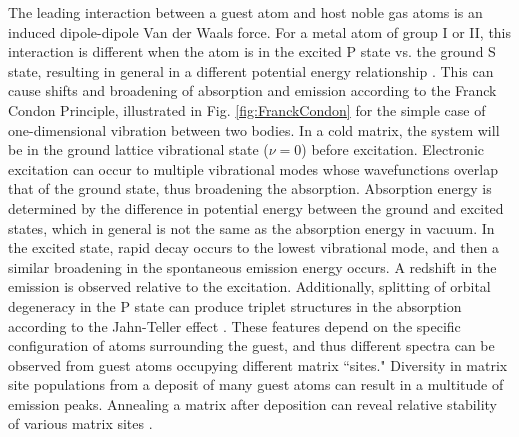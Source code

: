 
The leading interaction between a guest atom and host noble gas atoms is an induced dipole-dipole Van der Waals force.  For a metal atom of group I or II, this interaction is different when the atom is in the excited P state vs. the ground S state, resulting in general in a different potential energy relationship \cite{crepin}.  This can cause shifts and broadening of absorption and emission according to the Franck Condon Principle, illustrated in Fig. \ref{fig:FranckCondon} for the simple case of one-dimensional vibration between two bodies.  In a cold matrix, the system will be in the ground lattice vibrational state ($\nu =0$) before excitation.  Electronic excitation can occur to multiple vibrational modes whose wavefunctions overlap that of the ground state, thus broadening the absorption.  Absorption energy is determined by the difference in potential energy between the ground and excited states, which in general is not the same as the absorption energy in vacuum.  In the excited state, rapid decay occurs to the lowest vibrational mode, and then a similar broadening in the spontaneous emission energy occurs.  A redshift in the emission is observed relative to the excitation.  Additionally, splitting of orbital degeneracy in the P state can produce triplet structures in the absorption according to the Jahn-Teller effect \cite{jahnteller}.  These features depend on the specific configuration of atoms surrounding the guest, and thus different spectra can be observed from guest atoms occupying different matrix ``sites."  Diversity in matrix site populations from a deposit of many guest atoms can result in a multitude of emission peaks.  Annealing a matrix after deposition can reveal relative stability of various matrix sites \cite{crepin}.





